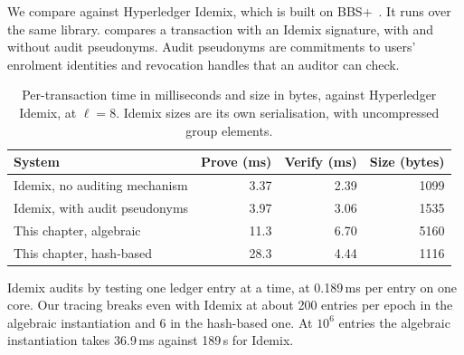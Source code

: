 We compare against Hyperledger Idemix, which is built on
BBS+~\cite{CCS:CamVan02,SCN:AuSusMu06,CDL16}. It runs over the same library.
 compares a transaction with an Idemix signature, with and
without audit pseudonyms. Audit pseudonyms are commitments to users' enrolment
identities and revocation handles that an auditor can check.

\begin{table}[htbp] \centering \small
  \begin{tabular}{l r r r} \toprule
    System & Prove (ms) & Verify (ms) & Size (bytes) \\
    \midrule
    Idemix, no auditing mechanism & 3.37 & 2.39 & 1099 \\
    Idemix, with audit pseudonyms & 3.97 & 3.06 & 1535 \\
    \midrule
    This chapter, algebraic & 11.3 & 6.70 & 5160 \\
    This chapter, hash-based & 28.3 & 4.44 & 1116 \\
  \bottomrule \end{tabular}
\caption[Tracing against Idemix]{Per-transaction time in milliseconds and size in bytes, against Hyperledger Idemix, at $\ell = 8$. Idemix sizes are its own serialisation, with
uncompressed group elements.} \label{tab:txid-idemix}
%
\end{table}

Idemix audits by testing one ledger entry at a time, at 0.189\,ms per
entry on one core. Our tracing breaks even with Idemix at
about 200 entries per epoch in the algebraic instantiation and 6 in the
hash-based one. At $10^6$ entries the algebraic instantiation takes
36.9\,ms against 189\,s for Idemix.
